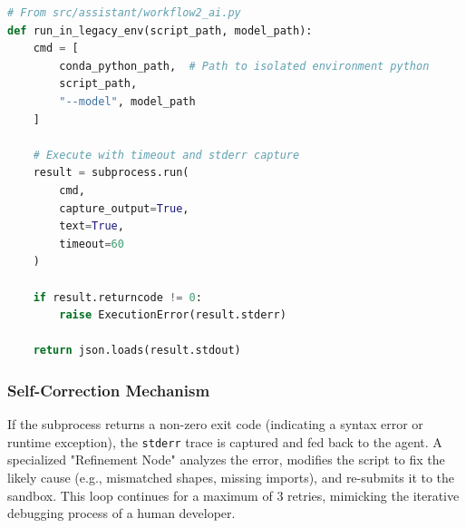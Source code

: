 \begin{lstlisting}[language=Python, caption={Subprocess execution wrapper for handling legacy environments.}, label={lst:subprocess}]
# From src/assistant/workflow2_ai.py
def run_in_legacy_env(script_path, model_path):
    cmd = [
        conda_python_path,  # Path to isolated environment python
        script_path,
        "--model", model_path
    ]
    
    # Execute with timeout and stderr capture
    result = subprocess.run(
        cmd, 
        capture_output=True, 
        text=True, 
        timeout=60
    )
    
    if result.returncode != 0:
        raise ExecutionError(result.stderr)
        
    return json.loads(result.stdout)
\end{lstlisting}

\subsubsection{Self-Correction Mechanism}
If the subprocess returns a non-zero exit code (indicating a syntax error or runtime exception), the \texttt{stderr} trace is captured and fed back to the agent. A specialized "Refinement Node" analyzes the error, modifies the script to fix the likely cause (e.g., mismatched shapes, missing imports), and re-submits it to the sandbox. This loop continues for a maximum of 3 retries, mimicking the iterative debugging process of a human developer.

